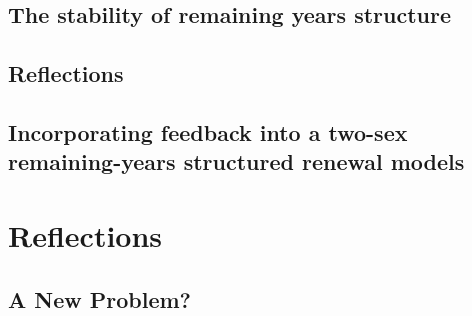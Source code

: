   \section{The stability of remaining years structure}
    
  
  \section{Reflections}
      
        
  \section{Incorporating feedback into a two-sex remaining-years structured
  renewal models}


\chapter{Reflections}
  \section{A New Problem?}
    


